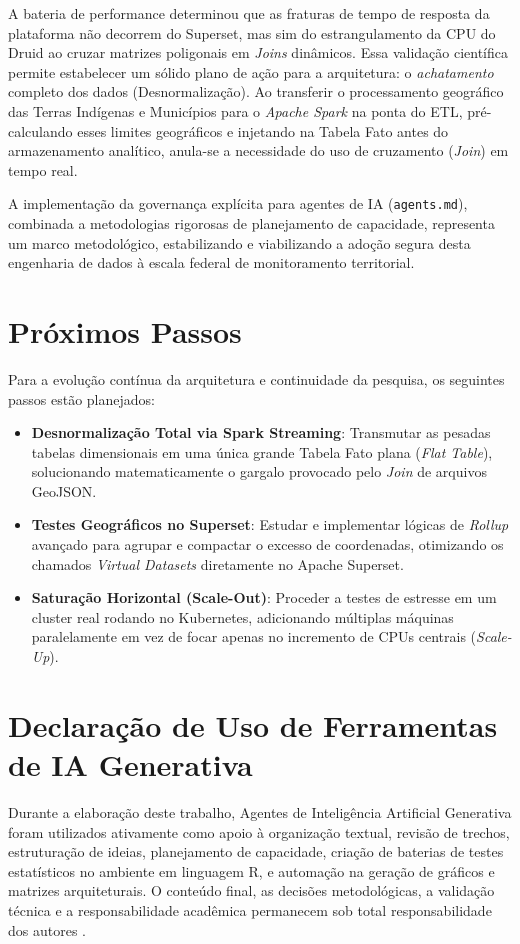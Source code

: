 \documentclass[12pt]{article}
\begin{document}
A bateria de performance determinou que as fraturas de tempo de resposta da plataforma não decorrem do Superset, mas sim do estrangulamento da CPU do Druid ao cruzar matrizes poligonais em \textit{Joins} dinâmicos. Essa validação científica permite estabelecer um sólido plano de ação para a arquitetura: o \textit{achatamento} completo dos dados (Desnormalização). Ao transferir o processamento geográfico das Terras Indígenas e Municípios para o \textit{Apache Spark} na ponta do ETL, pré-calculando esses limites geográficos e injetando na Tabela Fato antes do armazenamento analítico, anula-se a necessidade do uso de cruzamento (\textit{Join}) em tempo real.

A implementação da governança explícita para agentes de IA (\texttt{agents.md}), combinada a metodologias rigorosas de planejamento de capacidade, representa um marco metodológico, estabilizando e viabilizando a adoção segura desta engenharia de dados à escala federal de monitoramento territorial.

\section{Próximos Passos}

Para a evolução contínua da arquitetura e continuidade da pesquisa, os seguintes passos estão planejados:
\begin{itemize}
    \item \textbf{Desnormalização Total via Spark Streaming}: Transmutar as pesadas tabelas dimensionais em uma única grande Tabela Fato plana (\textit{Flat Table}), solucionando matematicamente o gargalo provocado pelo \textit{Join} de arquivos GeoJSON.
    \item \textbf{Testes Geográficos no Superset}: Estudar e implementar lógicas de \textit{Rollup} avançado para agrupar e compactar o excesso de coordenadas, otimizando os chamados \textit{Virtual Datasets} diretamente no Apache Superset.
    \item \textbf{Saturação Horizontal (Scale-Out)}: Proceder a testes de estresse em um cluster real rodando no Kubernetes, adicionando múltiplas máquinas paralelamente em vez de focar apenas no incremento de CPUs centrais (\textit{Scale-Up}).
\end{itemize}

\section*{Declaração de Uso de Ferramentas de IA Generativa}

Durante a elaboração deste trabalho, Agentes de Inteligência Artificial Generativa foram utilizados ativamente como apoio à organização textual, revisão de trechos, estruturação de ideias, planejamento de capacidade, criação de baterias de testes estatísticos no ambiente em linguagem R, e automação na geração de gráficos e matrizes arquiteturais. O conteúdo final, as decisões metodológicas, a validação técnica e a responsabilidade acadêmica permanecem sob total responsabilidade dos autores \cite{openai_chatgpt}.



\end{document}
